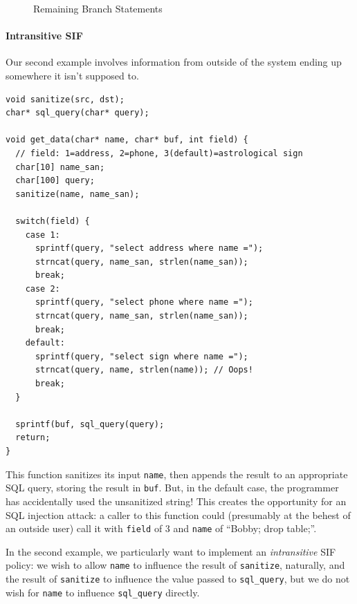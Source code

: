 \documentclass[acmsmall,review,anonymous]{acmart}\settopmatter{printfolios=true,printccs=false,printacmref=false}
\begin{document}
\begin{figure}
\begin{subfigure}{\textwidth}
  \end{subfigure}
  
  \caption{Remaining Branch Statements}
  \label{fig:rest}
\end{figure}

\paragraph*{Intransitive SIF}

Our second example involves information from outside of the system ending up somewhere it isn't supposed to.

\begin{verbatim}
void sanitize(src, dst);
char* sql_query(char* query);

void get_data(char* name, char* buf, int field) {
  // field: 1=address, 2=phone, 3(default)=astrological sign
  char[10] name_san;
  char[100] query;
  sanitize(name, name_san);

  switch(field) {
    case 1:
      sprintf(query, "select address where name =");
      strncat(query, name_san, strlen(name_san));
      break;
    case 2:
      sprintf(query, "select phone where name =");
      strncat(query, name_san, strlen(name_san));
      break;
    default:
      sprintf(query, "select sign where name =");
      strncat(query, name, strlen(name)); // Oops!
      break;
  }

  sprintf(buf, sql_query(query);
  return;
}
\end{verbatim}

This function sanitizes its input {\tt name}, then appends the result to an appropriate SQL
query, storing the result in {\tt buf}. But, in the default case, the programmer has accidentally
used the unsanitized string! This creates the opportunity for an SQL injection attack: a caller
to this function could (presumably at the behest of an outside user) call it with {\tt field} of
3 and {\tt name} of ``Bobby; drop table;''.

In the second example, we particularly want to implement an {\it intransitive} SIF policy:
we wish to allow {\tt name} to influence the result of {\tt sanitize}, naturally, and the result
of {\tt sanitize} to influence the value passed to {\tt sql\_query}, but we do not wish for
{\tt name} to influence {\tt sql\_query} directly.
\end{document}
